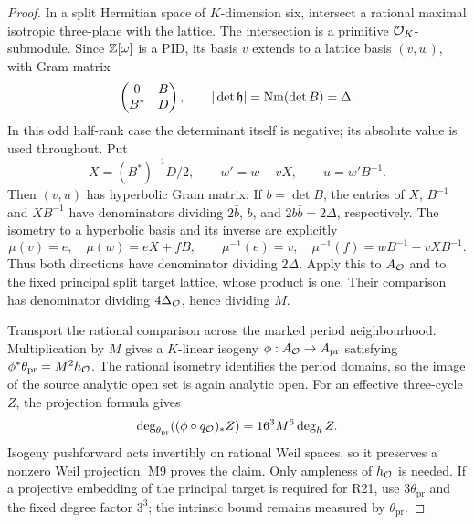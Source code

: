 \begin{proof}
In a split Hermitian space of $K$-dimension six, intersect a rational
maximal isotropic three-plane with the lattice. The intersection is
a primitive $\mathcal O_K$-submodule. Since $\mathbb Z[\omega]$ is a PID, its basis
$v$ extends to a lattice basis $(v,w)$, with Gram matrix
\[
 \begin{pmatrix}0&B\\B^*&D\end{pmatrix},
 \qquad |\det\mathfrak h|=\operatorname{Nm}(\det B)=\Delta.
\]
In this odd half-rank case the determinant itself is negative; its
absolute value is used throughout. Put
\[
 X=(B^*)^{-1}D/2,\qquad w'=w-vX,\qquad u=w'B^{-1}.
\]
Then $(v,u)$ has hyperbolic Gram matrix. If $b=\det B$, the entries
of $X$, $B^{-1}$ and $XB^{-1}$ have denominators dividing
$2\bar b$, $b$, and $2b\bar b=2\Delta$, respectively.
The isometry to a hyperbolic basis and its inverse are explicitly
\[
 \mu(v)=e,\quad \mu(w)=eX+fB,\qquad
 \mu^{-1}(e)=v,\quad \mu^{-1}(f)=wB^{-1}-vXB^{-1}.
\]
Thus both directions have denominator dividing $2\Delta$.
Apply this to $A_{\mathcal O}$ and to the fixed principal split target
lattice, whose product is one. Their comparison has denominator
dividing $4\Delta_{\mathcal O}$, hence dividing $M$.

Transport the rational comparison across the marked period
neighbourhood. Multiplication by $M$ gives a $K$-linear isogeny
$\phi:A_{\mathcal O}\to A_{\mathrm{pr}}$ satisfying
$\phi^*\theta_{\mathrm{pr}}=M^2h_{\mathcal O}$.
The rational isometry identifies the period domains, so the image
of the source analytic open set is again analytic open.
For an effective three-cycle $Z$, the projection formula gives
\[
 \deg_{\theta_{\mathrm{pr}}}
       ((\phi\circ q_{\mathcal O})_*Z)=16^3M^6\deg_h Z.
\]
Isogeny pushforward acts invertibly on rational Weil spaces, so it
preserves a nonzero Weil projection. M9 proves the claim.
Only ampleness of $h_{\mathcal O}$ is needed. If a projective embedding of
the principal target is required for R21, use $3\theta_{\mathrm{pr}}$
and the fixed degree factor $3^3$; the intrinsic bound remains
measured by $\theta_{\mathrm{pr}}$.
\end{proof}

